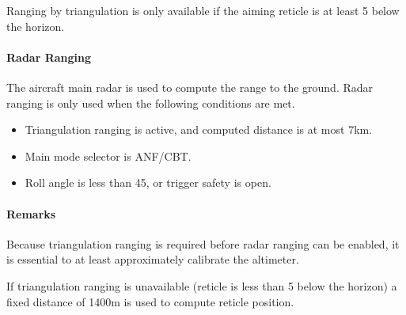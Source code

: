Ranging by triangulation is only available if the aiming reticle is at
least 5\textdegree{} below the horizon.

\paragraph{Radar Ranging}
The aircraft main radar is used to compute the range to the ground.
Radar ranging is only used when the following conditions are met.
\begin{itemize}[nosep]
  \item Triangulation ranging is active, and computed distance is at most 7km.
  \item Main mode selector is ANF/CBT.
  \item Roll angle is less than 45\textdegree{}, or trigger safety is open.
\end{itemize}

\paragraph{Remarks}
Because triangulation ranging is required before radar ranging can be enabled,
it is essential to at least approximately calibrate the altimeter.

If triangulation ranging is unavailable (reticle is less than 5\textdegree{} below the horizon)
a fixed distance of 1400m is used to compute reticle position.

